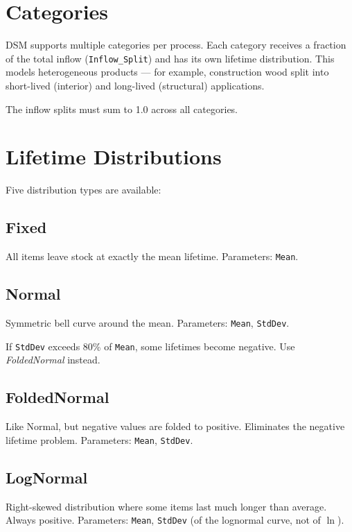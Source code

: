 \section{Categories}

DSM supports multiple categories per process. Each category receives a fraction of the total inflow (\texttt{Inflow\_Split}) and has its own lifetime distribution. This models heterogeneous products --- for example, construction wood split into short-lived (interior) and long-lived (structural) applications.

\begin{notebox}
The inflow splits must sum to 1.0 across all categories.
\end{notebox}

\section{Lifetime Distributions}

Five distribution types are available:

\subsection{Fixed}
All items leave stock at exactly the mean lifetime. Parameters: \texttt{Mean}.

\subsection{Normal}
Symmetric bell curve around the mean. Parameters: \texttt{Mean}, \texttt{StdDev}.

\begin{warnbox}
If \texttt{StdDev} exceeds 80\% of \texttt{Mean}, some lifetimes become negative. Use \emph{FoldedNormal} instead.
\end{warnbox}

\subsection{FoldedNormal}
Like Normal, but negative values are folded to positive. Eliminates the negative lifetime problem. Parameters: \texttt{Mean}, \texttt{StdDev}.

\subsection{LogNormal}
Right-skewed distribution where some items last much longer than average. Always positive. Parameters: \texttt{Mean}, \texttt{StdDev} (of the lognormal curve, not of $\ln$).

